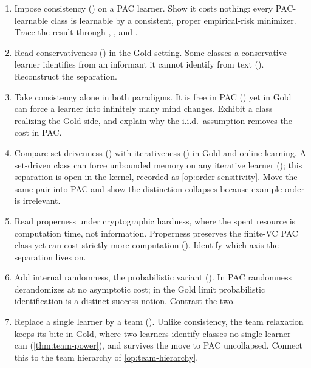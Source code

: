 \begin{enumerate}[leftmargin=*,itemsep=3pt]
\item Impose consistency () on a PAC learner. Show it costs nothing: every PAC-learnable class is learnable by a consistent, proper empirical-risk minimizer. Trace the result through , , and .

\item Read conservativeness () in the Gold setting. Some classes a conservative learner identifies from an informant it cannot identify from text (\cite{Angluin1980,Gold1967,CaseSmith1983}). Reconstruct the separation.

\item Take consistency alone in both paradigms. It is free in PAC () yet in Gold can force a learner into infinitely many mind changes. Exhibit a class realizing the Gold side, and explain why the i.i.d.\ assumption removes the cost in PAC.

\item Compare set-drivenness () with iterativeness () in Gold and online learning. A set-driven class can force unbounded memory on any iterative learner (\cite{KotzingPalenta2016,Gold1967}); this separation is open in the kernel, recorded as \cref{op:order-sensitivity}. Move the same pair into PAC and show the distinction collapses because example order is irrelevant.

\item Read properness under cryptographic hardness, where the spent resource is computation time, not information. Properness preserves the finite-VC PAC class yet can cost strictly more computation (\cite{PittValiant1988}). Identify which axis the separation lives on.

\item Add internal randomness, the probabilistic variant (). In PAC randomness derandomizes at no asymptotic cost; in the Gold limit probabilistic identification is a distinct success notion. Contrast the two.

\item Replace a single learner by a team (). Unlike consistency, the team relaxation keeps its bite in Gold, where two learners identify classes no single learner can (\cref{thm:team-power}), and survives the move to PAC uncollapsed. Connect this to the team hierarchy of \cref{op:team-hierarchy}.


\end{enumerate}
